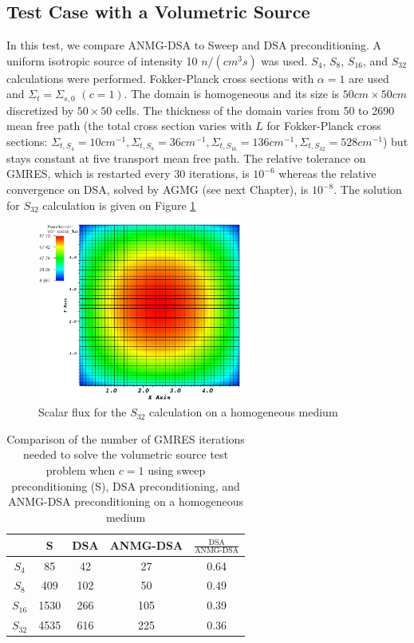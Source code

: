 \subsection{Test Case with a Volumetric Source}
In this test, we compare ANMG-DSA to Sweep and DSA preconditioning. A uniform
isotropic source of intensity 10 $n/(cm^3 s)$ was used. $S_4$, $S_8$, $S_{16}$, and
$S_{32}$ calculations were performed. Fokker-Planck cross sections with
$\alpha=1$ are used and $\Sigma_t = \Sigma_{s,0}$ $(c=1)$. The domain is homogeneous
and its size is $50cm \times 50cm$ discretized by $50\times 50$ cells. The 
thickness of the domain varies from 50 to 2690 mean free path (the total cross 
section varies with $L$ for Fokker-Planck cross sections: $\Sigma_{t,S_4}=10cm^{-1},
\Sigma_{t,S_8}=36cm^{-1}, \Sigma_{t,S_{16}}=136cm^{-1}, 
\Sigma_{t,S_{32}}=528cm^{-1}$) but stays constant at five transport
mean free path. The relative tolerance on GMRES, which is restarted every 30
iterations, is $10^{-6}$ whereas the
relative convergence on DSA, solved by AGMG (see next Chapter), is $10^{-8}$.
The solution for $S_{32}$ calculation is given on Figure \ref{fig_s_32}
\begin{figure}[H]
  \centering
  \includegraphics[width=0.6\textwidth]{Anmg/homog_anmg_crop}
  \caption{Scalar flux for the $S_{32}$ calculation on a homogeneous medium}
  \label{fig_s_32}
\end{figure}
\begin{table}[H]
  \begin{center}
    \caption{Comparison of the number of GMRES iterations needed to solve the 
      volumetric source test problem when $c=1$ using sweep preconditioning (S), DSA 
    preconditioning, and ANMG-DSA preconditioning on a homogeneous medium}
    \begin{tabular}{|c|c|c|c|c|}
      \hline
      & S & DSA & ANMG-DSA & $\frac{\textrm{DSA}}{\textrm{ANMG-DSA}}$ \\
      \hline
      $S_4$ & 85   & 42  & 27  & 0.64 \\
      $S_8$ & 409  & 102 & 50  & 0.49 \\
   $S_{16}$ & 1530 & 266 & 105 & 0.39 \\
   $S_{32}$ & 4535 & 616 & 225 & 0.36 \\
      \hline
    \end{tabular}
    \label{table_gmres_homog}
  \end{center}
\end{table}
